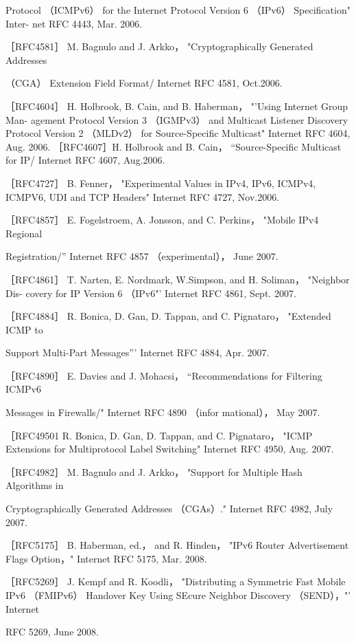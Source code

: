 Protocol （ICMPv6） for the Internet Protocol Version 6 （IPv6） Specification" Inter-
net RFC 4443, Mar. 2006.

［RFC4581］ M. Bagnulo and J. Arkko， "Cryptographically Generated Addresses

（CGA） Extension Field Format/ Internet RFC 4581, Oct.2006.

［RFC4604］ H. Holbrook, B. Cain, and B. Haberman， "'Using Internet Group Man-
agement Protocol Version 3 （IGMPv3） and Multicast Listener Discovery Protocol
Version 2 （MLDv2） for Source-Specific Multicast" Internet RFC 4604, Aug. 2006.
［RFC4607］H. Holbrook and B. Cain， “Source-Specific Multicast for IP/ Internet
RFC 4607, Aug.2006.

［RFC4727］ B. Fenner， "Experimental Values in IPv4, IPv6, ICMPv4, ICMPV6, UDI
and TCP Headers" Internet RFC 4727, Nov.2006.

［RFC4857］ E. Fogelstroem, A. Jonsson, and C. Perkins， "Mobile IPv4 Regional

Registration/” Internet RFC 4857 （experimental）， June 2007.

［RFC4861］ T. Narten, E. Nordmark, W.Simpson, and H. Soliman， "Neighbor Dis-
covery for IP Version 6 （IPv6"' Internet RFC 4861, Sept. 2007.

［RFC4884］ R. Bonica, D. Gan, D. Tappan, and C. Pignataro， "Extended ICMP to

Support Multi-Part Messages”' Internet RFC 4884, Apr. 2007.

［RFC4890］ E. Davies and J. Mohacsi， “Recommendations for Filtering ICMPv6

Messages in Firewalls/" Internet RFC 4890 （infor mational）， May 2007.

［RFC49501 R. Bonica, D. Gan, D. Tappan, and C. Pignataro， "ICMP Extensions for
Multiprotocol Label Switching" Internet RFC 4950, Aug. 2007.

［RFC4982］ M. Bagnulo and J. Arkko， "Support for Multiple Hash Algorithms in

Cryptographically Generated Addresses （CGAs）." Internet RFC 4982, July 2007.

［RFC5175］ B. Haberman, ed.， and R. Hinden， "IPv6 Router Advertisement Flags
Option，" Internet RFC 5175, Mar. 2008.

［RFC5269］ J. Kempf and R. Koodli， "Distributing a Symmetric Fast Mobile IPv6
（FMIPv6） Handover Key Using SEcure Neighbor Discovery （SEND），"' Internet

RFC 5269, June 2008.

